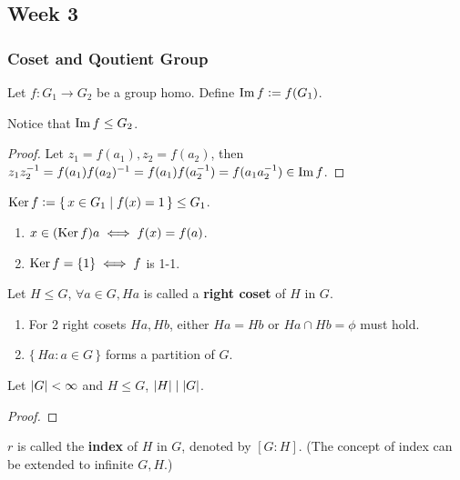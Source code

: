 \subsection{Week 3}
\subsubsection{Coset and Qoutient Group}
Let $f: G_1 \to G_2$ be a group homo. Define $\operatorname{Im} f \vcentcolon= f(G_1)$.

Notice that $\operatorname{Im} f \le G_2$.
\begin{proof}
  Let $z_1 = f(a_1), z_2 = f(a_2)$, then
  $z_1z_2^{-1} = f(a_1)f(a_2)^{-1} = f(a_1)f(a_2^{-1}) = f(a_1a_2^{-1}) \in
  \operatorname{Im} f$.
\end{proof}

\begin{definition}
  $\operatorname{Ker} f \vcentcolon= \{\, x \in G_1 \mid f(x) = 1 \,\} \le G_1$.
\end{definition}

\begin{fact} \mbox{}
  \begin{enumerate}
    \item $x \in (\operatorname{Ker} f) a \iff f(x) = f(a)$.
    \item $\operatorname{Ker} f = \{ 1 \} \iff f$ is 1-1.
  \end{enumerate}
\end{fact}

\begin{definition}
  Let $H \le G$, $\forall a \in G, Ha$ is called a {\bf right coset} of $H$
  in $G$.
\end{definition}

\begin{fact} \mbox{}
  \begin{enumerate}
    \item For 2 right cosets $Ha, Hb$, either $Ha = Hb$ or $Ha \cap Hb = \phi$
      must hold.
    \item $\{\, Ha : a\in G \,\}$ forms a partition of $G$.
  \end{enumerate}
\end{fact}

\begin{theorem}[Lagrange]
  Let $\lvert G\rvert < \infty$ and $H \le G$, $\lvert H\rvert \mid \lvert G\rvert$.
  \begin{proof}
  \end{proof}
\end{theorem}

\begin{remark}
  $r$ is called the {\bf index} of $H$ in $G$, denoted by $[G:H]$.
  (The concept of index can be extended to infinite $G, H$.)
\end{remark}

